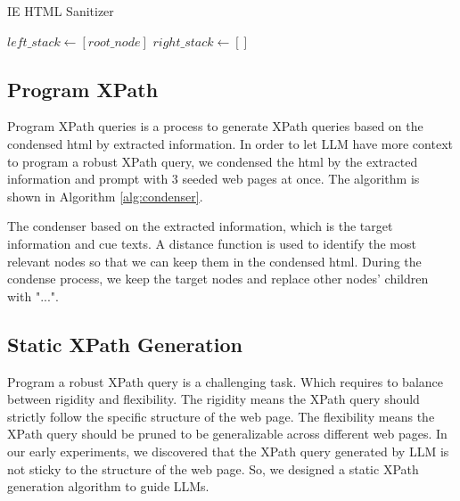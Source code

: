 \documentclass[a4paper]{article}
\begin{document}
\begin{algorithm}
  \SetAlgoLined
  \caption{IE HTML Sanitizer}
  \label{alg:sanitizer}
  
  $left\_stack \gets [root\_node]$\;
  $right\_stack \gets []$\;
  
  
\end{algorithm}

\subsection{Program XPath}

Program XPath queries is a process to generate XPath queries based on the condensed html by extracted information. In order to let LLM have more context to program a robust XPath query, we condensed the html by the extracted information and prompt with 3 seeded web pages at once. The algorithm is shown in Algorithm \ref{alg:condenser}.

The condenser based on the extracted information, which is the target information and cue texts. A distance function is used to identify the most relevant nodes so that we can keep them in the condensed html. During the condense process, we keep the target nodes and replace other nodes' children with "...".


\subsection{Static XPath Generation}

Program a robust XPath query is a challenging task. Which requires to balance between rigidity and flexibility. The rigidity means the XPath query should strictly follow the specific structure of the web page. The flexibility means the XPath query should be pruned to be generalizable across different web pages. In our early experiments, we discovered that the XPath query generated by LLM is not sticky to the structure of the web page. So, we designed a static XPath generation algorithm to guide LLMs.
\end{document}
